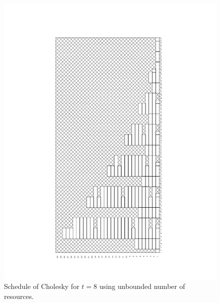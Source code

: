 \begin{frame}

\begin{figure}
\begin{center}
\includegraphics[width=.5\textwidth,angle=270]{./fig/t8_p30_fwd.pdf}
\caption{Schedule of Cholesky for $t=8$ using unbounded number of resources.}
\end{center}
\end{figure}


\end{frame}






